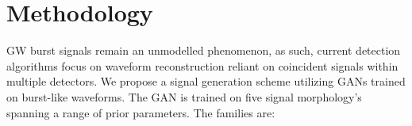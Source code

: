 \documentclass[12pt]{iopart}
\begin{document}
\section{Methodology}
GW burst signals remain an unmodelled phenomenon, as such, current detection algorithms focus on waveform reconstruction reliant on coincident signals within multiple detectors. We propose a signal generation scheme utilizing GANs trained on burst-like waveforms. The GAN is trained on five signal morphology's spanning a range of prior parameters. The families are:

\end{document}
